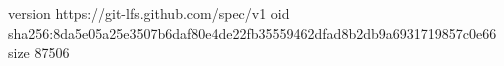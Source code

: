 version https://git-lfs.github.com/spec/v1
oid sha256:8da5e05a25e3507b6daf80e4de22fb35559462dfad8b2db9a6931719857c0e66
size 87506
